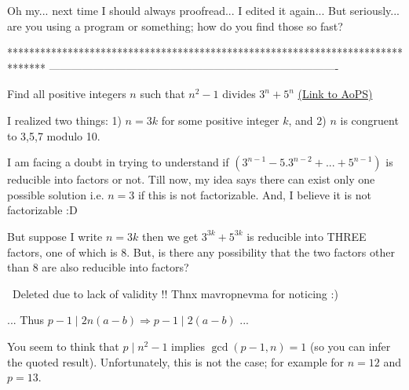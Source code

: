 \begin{solution}
	Oh my... next time I should always proofread... I edited it again... But seriously... are you using a program or something; how do you find those so fast?
\end{solution}
*******************************************************************************
-------------------------------------------------------------------------------

\begin{problem}
	Find all positive integers $n$ such that $n^2-1$ divides $3^n+5^n$
	\flushright \href{https://artofproblemsolving.com/community/c6h589845}{(Link to AoPS)}
\end{problem}



\begin{solution}
	I realized two things: 1) $n=3k$ for some positive integer $k$, and 2) $n$ is congruent to 3,5,7 modulo 10.

I am facing a doubt in trying to understand if $(3^{n-1}-5.3^{n-2}+...+5^{n-1})$ is reducible into factors or not. Till now, my idea says there can exist only one possible solution i.e. $n=3$ if this is not factorizable. And, I believe it is not factorizable :D

But suppose I write $n=3k$ then we get $3^{3k}+5^{3k}$ is reducible into THREE factors, one of which is 8. But, is there any possibility that the two factors other than 8 are also reducible into factors?
\end{solution}



\begin{solution}
	~Deleted due to lack of validity !!
Thnx mavropnevma for noticing :)
\end{solution}



\begin{solution}
	\begin{tcolorbox}... Thus $p-1\mid 2n(a-b) \Rightarrow p-1\mid 2(a-b) $ ...\end{tcolorbox}
You seem to think that $p\mid n^2 -1$ implies $\gcd(p-1,n)=1$ (so you can infer the quoted result). Unfortunately, this is not the case; for example for $n=12$ and $p=13$.
\end{solution}



